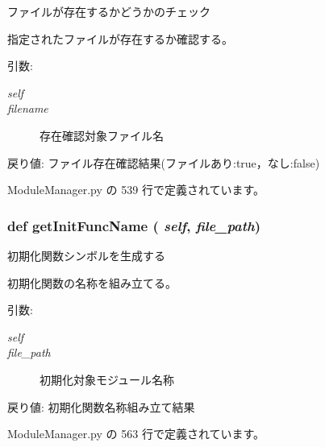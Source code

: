 ファイルが存在するかどうかのチェック 

指定されたファイルが存在するか確認する。

\begin{Desc}
\item[引数:]
\begin{description}
\item[{\em self}]\item[{\em filename}]存在確認対象ファイル名\end{description}
\end{Desc}
\begin{Desc}
\item[戻り値:]ファイル存在確認結果(ファイルあり:true，なし:false) \end{Desc}


 ModuleManager.py の 539 行で定義されています。
\subsubsection{\setlength{\rightskip}{0pt plus 5cm}def getInitFuncName ( {\em self},  {\em file\_\-path})}\label{classsource__py_1_1_module_manager_1_1_module_manager_ca6b6d99997111fee1669c8fc6daf845}


初期化関数シンボルを生成する 

初期化関数の名称を組み立てる。

\begin{Desc}
\item[引数:]
\begin{description}
\item[{\em self}]\item[{\em file\_\-path}]初期化対象モジュール名称\end{description}
\end{Desc}
\begin{Desc}
\item[戻り値:]初期化関数名称組み立て結果 \end{Desc}


 ModuleManager.py の 563 行で定義されています。